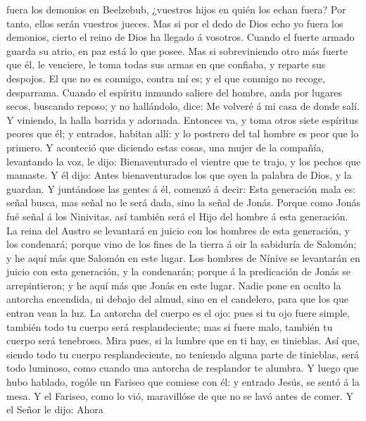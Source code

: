fuera los demonios en Beelzebub, ¿vuestros hijos en quién los echan
fuera? Por tanto, ellos serán vuestros jueces.  Mas si por
el dedo de Dios echo yo fuera los demonios, cierto el reino de Dios ha
llegado á vosotros.  Cuando el fuerte armado guarda su
atrio, en paz está lo que posee.  Mas si sobreviniendo otro
más fuerte que él, le venciere, le toma todas sus armas en que confiaba,
y reparte sus despojos.  El que no es conmigo, contra mí
es; y el que conmigo no recoge, desparrama.  Cuando el
espíritu inmundo saliere del hombre, anda por lugares secos, buscando
reposo; y no hallándolo, dice: Me volveré á mi casa de donde salí.
 Y viniendo, la halla barrida y adornada. 
Entonces va, y toma otros siete espíritus peores que él; y entrados,
habitan allí: y lo postrero del tal hombre es peor que lo primero.
 Y aconteció que diciendo estas cosas, una mujer de la
compañía, levantando la voz, le dijo: Bienaventurado el vientre que te
trajo, y los pechos que mamaste.  Y él dijo: Antes
bienaventurados los que oyen la palabra de Dios, y la guardan.
 Y juntándose las gentes á él, comenzó á decir: Esta
generación mala es: señal busca, mas señal no le será dada, sino la
señal de Jonás.  Porque como Jonás fué señal á los
Ninivitas, así también será el Hijo del hombre á esta generación.
 La reina del Austro se levantará en juicio con los hombres
de esta generación, y los condenará; porque vino de los fines de la
tierra á oir la sabiduría de Salomón; y he aquí más que Salomón en este
lugar.  Los hombres de Nínive se levantarán en juicio con
esta generación, y la condenarán; porque á la predicación de Jonás se
arrepintieron; y he aquí más que Jonás en este lugar. 
Nadie pone en oculto la antorcha encendida, ni debajo del almud, sino en
el candelero, para que los que entran vean la luz.  La
antorcha del cuerpo es el ojo: pues si tu ojo fuere simple, también todo
tu cuerpo será resplandeciente; mas si fuere malo, también tu cuerpo
será tenebroso.  Mira pues, si la lumbre que en ti hay, es
tinieblas.  Así que, siendo todo tu cuerpo resplandeciente,
no teniendo alguna parte de tinieblas, será todo luminoso, como cuando
una antorcha de resplandor te alumbra.  Y luego que hubo
hablado, rogóle un Fariseo que comiese con él: y entrado Jesús, se sentó
á la mesa.  Y el Fariseo, como lo vió, maravillóse de que
no se lavó antes de comer.  Y el Señor le dijo: Ahora

